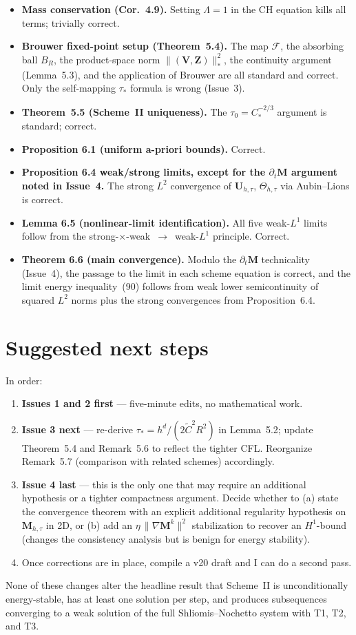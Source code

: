 \documentclass[11pt]{article}
\newcommand{\bM}{\mathbf{M}}
\newcommand{\bU}{\mathbf{U}}
\newcommand{\bV}{\mathbf{V}}
\newcommand{\bZ}{\mathbf{Z}}
\newcommand{\dt}{\tau}
\newcommand{\Ctilde}{\widetilde{C}}
\begin{document}
\begin{itemize}[leftmargin=*,itemsep=2pt]
\item \textbf{Mass conservation (Cor.~4.9).}  Setting $\Lambda=1$ in
the CH equation kills all terms; trivially correct.

\item \textbf{Brouwer fixed-point setup (Theorem~5.4).}  The map
$\mathcal{F}$, the absorbing ball $B_{R}$, the product-space norm
$\|(\bV,\bZ)\|_{*}^{2}$, the continuity argument (Lemma~5.3), and
the application of Brouwer are all standard and correct.  Only the
self-mapping $\dt_{*}$ formula is wrong (Issue~3).

\item \textbf{Theorem~5.5 (Scheme~II uniqueness).}  The
$\dt_{0}=C_{*}^{-2/3}$ argument is standard; correct.

\item \textbf{Proposition 6.1 (uniform a-priori bounds).}  Correct.

\item \textbf{Proposition 6.4 weak/strong limits, except for the
$\partial_{t}\bM$ argument noted in Issue~4.}  The strong $L^{2}$
convergence of $\bU_{h,\dt}$, $\Theta_{h,\dt}$ via Aubin--Lions is
correct.

\item \textbf{Lemma 6.5 (nonlinear-limit identification).}  All five
weak-$L^{1}$ limits follow from the
strong-$\times$-weak~$\to$~weak-$L^{1}$ principle.  Correct.

\item \textbf{Theorem 6.6 (main convergence).}  Modulo the
$\partial_{t}\bM$ technicality (Issue~4), the passage to the limit
in each scheme equation is correct, and the limit energy
inequality~(90) follows from weak lower semicontinuity of squared
$L^{2}$ norms plus the strong convergences from
Proposition~6.4.
\end{itemize}

\section*{Suggested next steps}

In order:

\begin{enumerate}[leftmargin=*,itemsep=2pt]
\item \textbf{Issues 1 and 2 first} --- five-minute edits, no
mathematical work.
\item \textbf{Issue 3 next} --- re-derive $\dt_{*}=h^{d}/(2\Ctilde^{2}R^{2})$
in Lemma~5.2; update Theorem~5.4 and Remark~5.6 to reflect the
tighter CFL.  Reorganize Remark~5.7 (comparison with related
schemes) accordingly.
\item \textbf{Issue 4 last} --- this is the only one that may
require an additional hypothesis or a tighter compactness argument.
Decide whether to (a) state the convergence theorem with an
explicit additional regularity hypothesis on $\bM_{h,\dt}$ in 2D, or
(b) add an $\eta\,\|\nabla\bM^{k}\|^{2}$ stabilization to recover an
$H^{1}$-bound (changes the consistency analysis but is benign for
energy stability).
\item Once corrections are in place, compile a v20 draft and I can
do a second pass.
\end{enumerate}

\medskip
\noindent
None of these changes alter the headline result that Scheme~II is
unconditionally energy-stable, has at least one solution per step,
and produces subsequences converging to a weak solution of the full
Shliomis--Nochetto system with T1, T2, and T3.
\end{document}

